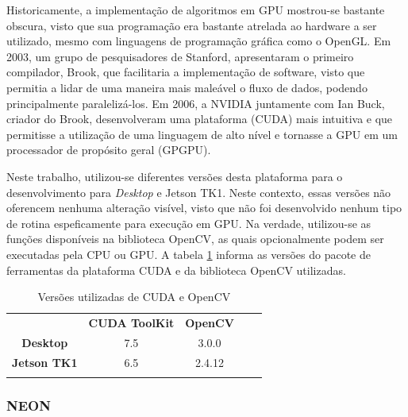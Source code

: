 Historicamente, a implementação de algoritmos em GPU mostrou-se bastante obscura, visto que sua programação era bastante atrelada ao hardware a ser utilizado, mesmo com linguagens de programação gráfica como o OpenGL. Em 2003, um grupo de pesquisadores de Stanford, apresentaram o primeiro compilador, Brook, que facilitaria a implementação de software, visto que permitia a lidar de uma maneira mais maleável o fluxo de dados, podendo principalmente paralelizá-los. Em 2006, a NVIDIA juntamente com Ian Buck, criador do Brook, desenvolveram uma plataforma (CUDA) mais intuitiva e que permitisse a utilização de uma linguagem de alto nível e tornasse a GPU em um processador de propósito geral (GPGPU)\cite{NVIDIA}.

Neste trabalho, utilizou-se diferentes versões desta plataforma para o desenvolvimento para \textit{Desktop} e Jetson TK1. Neste contexto, essas versões não oferencem nenhuma alteração visível, visto que não foi desenvolvido nenhum tipo de rotina espeficamente para execução em GPU. Na verdade, utilizou-se as funções disponíveis na biblioteca OpenCV, as quais opcionalmente podem ser executadas pela CPU ou GPU. A tabela \ref{cudaopencv} informa as versões do pacote de ferramentas da plataforma CUDA e da biblioteca OpenCV utilizadas. 

\begin{table}[]
\centering
\caption{Versões utilizadas de CUDA e OpenCV}
\label{cudaopencv}
\begin{tabular}{cccll}
                     & \textbf{CUDA ToolKit}	     & \textbf{OpenCV} 	       &  &  \\
\textbf{Desktop}     & 7.5                           & 3.0.0                   &  &  \\
\textbf{Jetson TK1}  & 6.5                           & 2.4.12                  &  &  \\
\multicolumn{1}{l}{} & \multicolumn{1}{l}{}          & \multicolumn{1}{l}{}    &  & 
\end{tabular}
\end{table}

\subsubsection{NEON}


